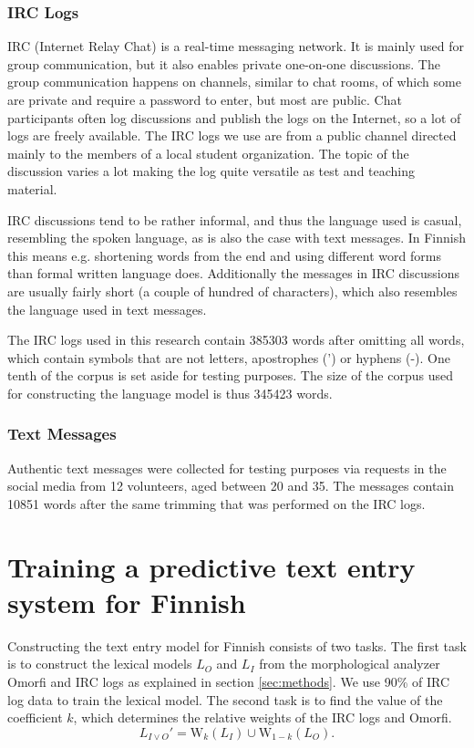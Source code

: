 \documentclass[a4paper,conference]{IEEEtran}
\begin{document}
\subsubsection{IRC Logs}
IRC (Internet Relay Chat) is a real-time messaging network. It is
mainly used for group communication, but it also enables private
one-on-one discussions. The group communication happens on channels,
similar to chat rooms, of which some are private and require a
password to enter, but most are public. Chat participants often log
discussions and publish the logs on the Internet, so a lot of logs are
freely available. The IRC logs we use are from a public channel
directed mainly to the members of a local student organization. The
topic of the discussion varies a lot making the log quite versatile as
test and teaching material.

IRC discussions tend to be rather informal, and thus the language used
is casual, resembling the spoken language, as is also the case with
text messages. In Finnish this means e.g. shortening words from the
end and using different word forms than formal written language
does. Additionally the messages in IRC discussions are usually fairly
short (a couple of hundred of characters), which also resembles the
language used in text messages.

The IRC logs used in this research contain 385303 words after omitting
all words, which contain symbols that are not letters, apostrophes (')
or hyphens (-). One tenth of the corpus is set aside for testing
purposes. The size of the corpus used for constructing the language
model is thus 345423 words.


\subsubsection{Text Messages}

Authentic text messages were collected for testing purposes via requests in the social media from 12 volunteers, aged between 20 and 35. The messages contain 10851 words after the same trimming that was performed on the IRC logs.

\section{Training a predictive text entry system for Finnish}

Constructing the text entry model for Finnish consists of two
tasks. The first task is to construct the lexical models $L_O$ and
$L_I$ from the morphological analyzer Omorfi and IRC logs as explained
in section \ref{sec:methods}. We use 90\% of IRC log data to train the
lexical model. The second task is to find the value of the coefficient
$k$, which determines the relative weights of the IRC logs and Omorfi.
\begin{equation}L_{I\vee O}' = \mathrm{W}_k(L_I) \cup \mathrm{W}_{1-k}(L_O)\text{.}\end{equation}
\end{document}
